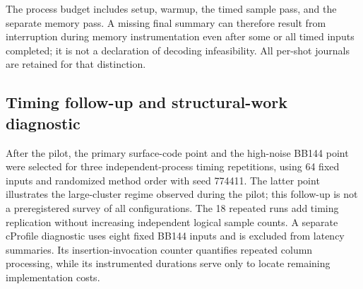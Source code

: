 The process budget includes setup, warmup, the timed sample pass, and the separate memory pass. A missing final summary can therefore result from interruption during memory instrumentation even after some or all timed inputs completed; it is not a declaration of decoding infeasibility. All per-shot journals are retained for that distinction.


\subsection{Timing follow-up and structural-work diagnostic}
After the pilot, the primary surface-code point and the high-noise BB144 point were selected for three independent-process timing repetitions, using 64 fixed inputs and randomized method order with seed 774411. The latter point illustrates the large-cluster regime observed during the pilot; this follow-up is not a preregistered survey of all configurations. The 18 repeated runs add timing replication without increasing independent logical sample counts. A separate cProfile diagnostic uses eight fixed BB144 inputs and is excluded from latency summaries. Its insertion-invocation counter quantifies repeated column processing, while its instrumented durations serve only to locate remaining implementation costs.
